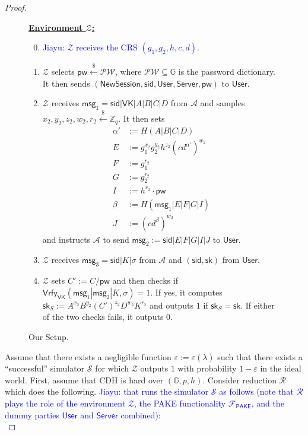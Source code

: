\documentclass[12pt,a4paper]{article}
\newcommand{\simulator}{\mathcal{S}}
\newcommand{\env}{\mathcal{Z}}
\newcommand{\adv}{\mathcal{A}}
\newcommand{\pake}{\mathcal{F}_{\mathsf{PAKE}}}
\newcommand{\user}{\mathsf{User}}
\newcommand{\sk}{\mathsf{sk}}
\newcommand{\pw}{\mathsf{pw}}
\newcommand{\newsession}{\mathsf{NewSession}}
\newcommand{\server}{\mathsf{Server}}
\newcommand{\msg}[1]{\mathsf{msg}_{#1}}
\def\xjy#1{\textcolor{blue}{Jiayu: #1}}
\begin{document}
\begin{proof}
	\begin{figure}[h]
		\begin{framed}
			\vspace{2mm}
			\textbf{\underline{Environment $\env$:}}
			\begin{enumerate}\setcounter{enumi}{-1}
                \item \xjy{$\env$ receives the CRS $(g_1, g_2, h, c, d)$}.
				\item $\env$ selects $\pw\xleftarrow{\$}\mathcal{PW}$, where $\mathcal{PW}\subseteq\mathbb{G}$ is the password dictionary. It then sends $(\newsession,\mathsf{sid},\user,\server,\pw)$ to $\user$.
				\item $\env$ receives $\msg{1} = \mathsf{sid}|\mathsf{VK}|A|B|C|D$ from $\adv$ and samples $x_2, y_2, z_2, w_2, r_2\xleftarrow{\$}\mathbb{Z}_q$. It then sets 
				\begin{align*}
					\alpha'&:=H(A|B|C|D)\\
					E &:= g_1^{x_2}g_2^{y_2}h^{z_2}(cd^{\alpha'})^{w_2}\\
					F &:= g_1^{r_2}\\
					G &:= g_2^{r_2}\\
					I &:= h^{r_2}\cdot\pw\\
					\beta &:= H(\msg{1}|E|F|G|I)\\
					J &:= (cd^{\beta})^{w_2}
				\end{align*}
			and instructs $\adv$ to send $\msg{2} := \mathsf{sid}|E|F|G|I|J$ to $\user$. 
			\item $\env$ receives $\msg{3}=\mathsf{sid}|K|\sigma$ from $\adv$ and $(\mathsf{sid}, \sk)$ from $\user$.
			\item $\env$ sets $C':=C/\pw$ and then checks if $\mathsf{Vrfy}_{\mathsf{VK}}(\msg{1}|\msg{2}|K,\sigma)=1$. If yes, it computes $\sk_S:=A^{x_2}B^{y_2}(C')^{z_2}D^{w_2}K^{r_2}$ and outputs $1$ if $\sk_S=\sk$. If either of the two checks fails, it outputs $0$.
			\end{enumerate}
			\vspace{2mm}
		\end{framed}
		\caption{Our Setup.}
		\label{fig:adv}
	\end{figure}

	Assume that there exists a negligible function $\varepsilon:=\varepsilon(\lambda)$ such that there exists a ``successful'' simulator $\simulator$ for which $\env$ outputs $1$ with probability $1-\varepsilon$ in the ideal world. First, assume that CDH is hard over $(\mathbb{G}, p, h)$. Consider reduction $\mathcal{R}$ which does the following. \xjy{that runs the simulator $\simulator$ as follows (note that $\mathcal{R}$ plays the role of the environment $\env$, the PAKE functionality $\pake$, and the dummy parties $\user$ and $\server$ combined):}\\
	

\end{proof}
\end{document}
